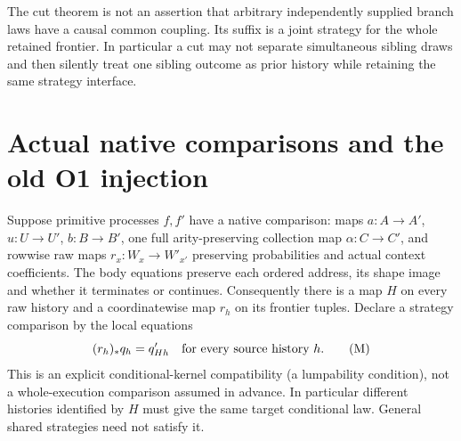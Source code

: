 \documentclass[11pt]{article}
\begin{document}
The cut theorem is not an assertion that arbitrary independently supplied branch laws have a causal common coupling. Its suffix is a joint strategy for the whole retained frontier. In particular a cut may not separate simultaneous sibling draws and then silently treat one sibling outcome as prior history while retaining the same strategy interface.

\section{Actual native comparisons and the old O1 injection}
Suppose primitive processes $f,f'$ have a native comparison: maps $a:A\to A'$, $u:U\to U'$, $b:B\to B'$, one full arity-preserving collection map $\alpha:C\to C'$, and rowwise raw maps $r_x:W_x\to W'_{x'}$ preserving probabilities and actual context coefficients. The body equations preserve each ordered address, its shape image and whether it terminates or continues. Consequently there is a map $H$ on every raw history and a coordinatewise map $r_h$ on its frontier tuples. Declare a strategy comparison by the local equations
\[
 (r_h)_*q_h=q'_{Hh}\quad\hbox{for every source history }h.     \tag{M}
\]
This is an explicit conditional-kernel compatibility (a lumpability condition), not a whole-execution comparison assumed in advance. In particular different histories identified by $H$ must give the same target conditional law. General shared strategies need not satisfy it.
\end{document}
